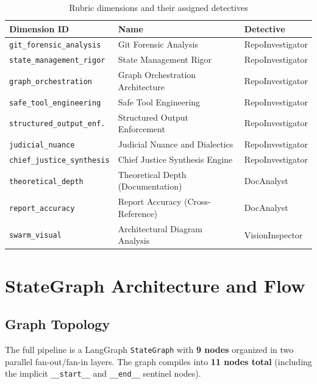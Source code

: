 \documentclass[12pt,a4paper]{article}
\begin{document}
\begin{table}[h]
\centering
\caption{Rubric dimensions and their assigned detectives}
\begin{tabular}{@{}lll@{}}
\toprule
\textbf{Dimension ID} & \textbf{Name} & \textbf{Detective} \\
\midrule
\texttt{git\_forensic\_analysis}       & Git Forensic Analysis            & RepoInvestigator \\
\texttt{state\_management\_rigor}      & State Management Rigor           & RepoInvestigator \\
\texttt{graph\_orchestration}          & Graph Orchestration Architecture & RepoInvestigator \\
\texttt{safe\_tool\_engineering}       & Safe Tool Engineering            & RepoInvestigator \\
\texttt{structured\_output\_enf.}      & Structured Output Enforcement    & RepoInvestigator \\
\texttt{judicial\_nuance}              & Judicial Nuance and Dialectics   & RepoInvestigator \\
\texttt{chief\_justice\_synthesis}     & Chief Justice Synthesis Engine    & RepoInvestigator \\
\texttt{theoretical\_depth}            & Theoretical Depth (Documentation)& DocAnalyst \\
\texttt{report\_accuracy}              & Report Accuracy (Cross-Reference)& DocAnalyst \\
\texttt{swarm\_visual}                 & Architectural Diagram Analysis   & VisionInspector \\
\bottomrule
\end{tabular}
\end{table}


\section{StateGraph Architecture and Flow}

\subsection{Graph Topology}

The full pipeline is a LangGraph \texttt{StateGraph} with \textbf{9 nodes} organized in two parallel fan-out/fan-in layers. The graph compiles into \textbf{11 nodes total} (including the implicit \texttt{\_\_start\_\_} and \texttt{\_\_end\_\_} sentinel nodes).
\end{document}
